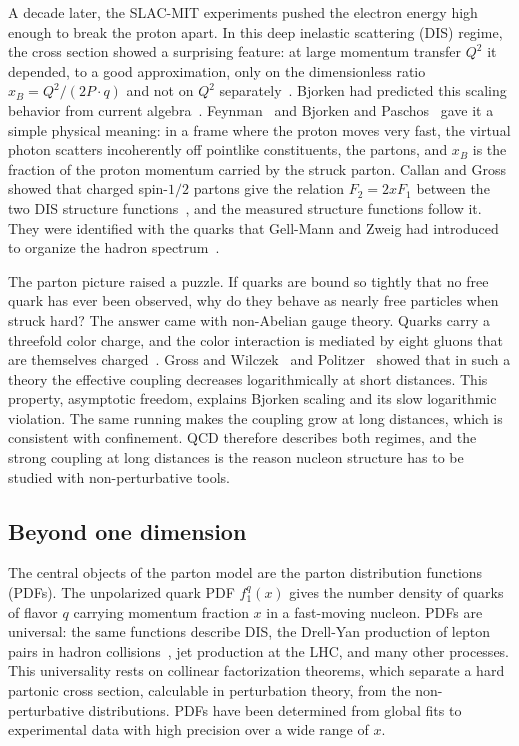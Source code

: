A decade later, the SLAC-MIT experiments pushed the electron energy high enough to break the proton apart. In this deep inelastic scattering (DIS) regime, the cross section showed a surprising feature: at large momentum transfer $Q^2$ it depended, to a good approximation, only on the dimensionless ratio $x_B = Q^2/(2P\cdot q)$ and not on $Q^2$ separately~\cite{Bloom:1969kc,Breidenbach:1969kd}. Bjorken had predicted this scaling behavior from current algebra~\cite{Bjorken:1968dy}. Feynman~\cite{Feynman:1969ej} and Bjorken and Paschos~\cite{Bjorken:1969ja} gave it a simple physical meaning: in a frame where the proton moves very fast, the virtual photon scatters incoherently off pointlike constituents, the partons, and $x_B$ is the fraction of the proton momentum carried by the struck parton. Callan and Gross showed that charged spin-$1/2$ partons give the relation $F_2 = 2x F_1$ between the two DIS structure functions~\cite{Callan:1969uq}, and the measured structure functions follow it. They were identified with the quarks that Gell-Mann and Zweig had introduced to organize the hadron spectrum~\cite{Gell-Mann:1964ewy,Zweig:1964jf}.

The parton picture raised a puzzle. If quarks are bound so tightly that no free quark has ever been observed, why do they behave as nearly free particles when struck hard? The answer came with non-Abelian gauge theory. Quarks carry a threefold color charge, and the color interaction is mediated by eight gluons that are themselves charged~\cite{Yang:1954ek,Fritzsch:1973pi}. Gross and Wilczek~\cite{Gross:1973id} and Politzer~\cite{Politzer:1973fx} showed that in such a theory the effective coupling decreases logarithmically at short distances. This property, asymptotic freedom, explains Bjorken scaling and its slow logarithmic violation. The same running makes the coupling grow at long distances, which is consistent with confinement. QCD therefore describes both regimes, and the strong coupling at long distances is the reason nucleon structure has to be studied with non-perturbative tools.

\subsection{Beyond one dimension}
\label{sec:intro_3d}

The central objects of the parton model are the parton distribution functions (PDFs). The unpolarized quark PDF $f_1^q(x)$ gives the number density of quarks of flavor $q$ carrying momentum fraction $x$ in a fast-moving nucleon. PDFs are universal: the same functions describe DIS, the Drell-Yan production of lepton pairs in hadron collisions~\cite{Drell:1970wh}, jet production at the LHC, and many other processes. This universality rests on collinear factorization theorems, which separate a hard partonic cross section, calculable in perturbation theory, from the non-perturbative distributions. PDFs have been determined from global fits to experimental data with high precision over a wide range of $x$.

